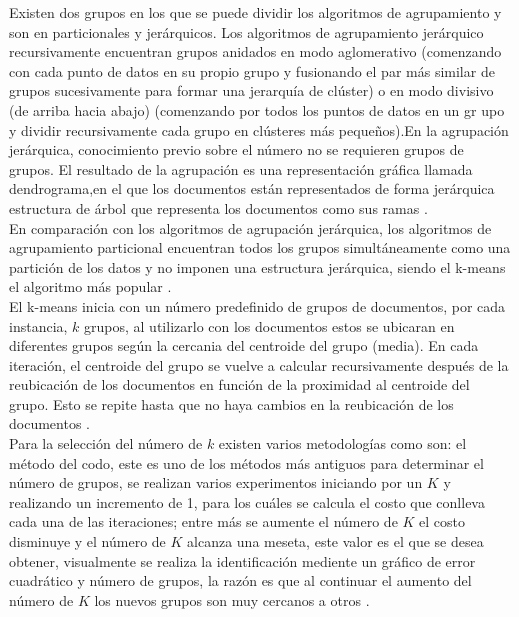 {Existen dos grupos en los que se puede dividir los algoritmos de agrupamiento y son en particionales y jerárquicos. Los algoritmos de agrupamiento jerárquico recursivamente encuentran grupos anidados en modo aglomerativo (comenzando con cada punto de datos en su propio grupo y fusionando el par más similar de grupos sucesivamente para formar una jerarquía de clúster) o en modo divisivo (de arriba hacia abajo) (comenzando por todos los puntos de datos en un gr upo y dividir recursivamente cada grupo en clústeres más pequeños).En la agrupación jerárquica, conocimiento previo sobre el número no se requieren grupos de grupos. El resultado de la agrupación es una representación gráfica llamada dendrograma,en el que los documentos están representados de forma jerárquica estructura de árbol que representa los documentos como sus ramas \cite{Renganathan2017,Jain2010}.\\

En comparación con los algoritmos de agrupación jerárquica, los algoritmos de agrupamiento  particional encuentran todos los grupos simultáneamente como una partición de los datos y no imponen una estructura jerárquica, siendo el k-means el algoritmo más popular \cite{Jain2010}. \\

El k-means inicia con un número predefinido de grupos de documentos, por cada instancia, $k$ grupos, al utilizarlo con los documentos estos se ubicaran en diferentes grupos según  la cercania del centroide del grupo (media). En cada iteración, el centroide del grupo se vuelve a calcular recursivamente después de la reubicación de los documentos en función de la proximidad al centroide del grupo. Esto se repite hasta que no haya cambios en la reubicación de los documentos \cite{Renganathan2017}. \\

Para la selección del número de $k$ existen varios metodologías como son: el método del codo, este es uno de los métodos más antiguos para determinar el número de grupos, se realizan varios experimentos iniciando por un $K$  y realizando un incremento de 1, para los cuáles se calcula el costo que conlleva cada una de las iteraciones; entre más se aumente el número de $K$ el costo disminuye y el número de $K$ alcanza una meseta, este valor es el que se desea obtener, visualmente se realiza la identificación mediente un gráfico de error cuadrático y número de grupos, la razón es que al continuar el aumento del número de $K$ los nuevos grupos son muy cercanos a otros \cite{Kodinariya2013}.\\ 

}
